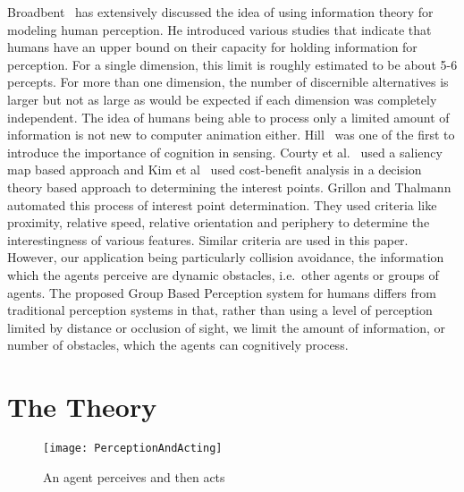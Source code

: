 \documentclass[runningheads,a4paper]{llncs}
\begin{document}
Broadbent~\cite{Broadbent:1965is} has extensively discussed the idea of using information theory for modeling human perception. He introduced various studies that indicate that humans have an upper bound on their capacity for holding information for perception. For a single dimension, this limit is roughly estimated to be about 5-6 percepts. For more than one dimension, the number of discernible alternatives is larger but not as large as would be expected if each dimension was completely independent. The idea of humans being able to process only a limited amount of information is not new to computer animation either. Hill~\cite{Hill:1999ww} was one of the first to introduce the importance of cognition in sensing. Courty et al.~\cite{Courty:2003hy} used a saliency map based approach and Kim et al~\cite{Kim:2005ub} used cost-benefit analysis in a decision theory based approach to determining the interest points. Grillon and Thalmann~\cite{Grillon:2009hf} automated this process of interest point determination. They used criteria like proximity, relative speed, relative orientation and periphery to determine the interestingness of various features. Similar criteria are used in this paper. However, our application being particularly collision avoidance, the information which the agents perceive are dynamic obstacles, i.e.\ other agents or groups of agents. The proposed Group Based Perception system for humans differs from traditional perception systems in that, rather than using a level of perception limited by distance or occlusion of sight, we limit the amount of information, or number of obstacles, which the agents can cognitively process.

\section{The Theory}
\label{theory}

\begin{figure}[!tb]
\centering
\texttt{[image: PerceptionAndActing]}
\caption{An agent perceives and then acts}
\label{Agent Perception Act}
\end{figure}
\end{document}
